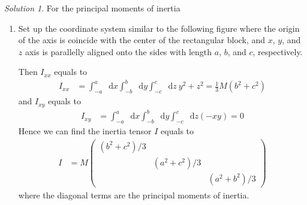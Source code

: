 \documentclass[twoside,11pt]{article}
\renewcommand*\d{\mathop{}\!\mathrm{d}}
\theoremstyle{definition}
\theoremstyle{remark}
\newtheorem*{solution}{Solution}
\begin{document}
\begin{solution}
For the principal moments of inertia
\begin{enumerate}[label=\roman*)]
\item
Set up the coordinate system similar to the following figure where the origin of the axis
is coincide with the center of the rectangular block, and $x$, $y$, and $z$ axis is parallelly aligned
onto the sides with length $a$, $b$, and $c$, respectively.
\begin{figure}[H]
    \tikzexternalenable
    \centering
    \def\a{1.5}
    \def\b{2}
    \def\c{0.8}
    \tikzexternaldisable
\end{figure}
Then $I_{xx}$ equals to
\begin{align*}
    I_{xx} &= \int_{-a}^a\d x \int_{-b}^b\d y \int_{-c}^c\d z~ y^2 + z^2 = \frac{1}{3}M(b^2+c^2)
\end{align*}
and $I_{xy}$ equals to
\begin{align*}
    I_{xy} &= \int_{-a}^a\d x \int_{-b}^b\d y \int_{-c}^c\d z (-xy) = 0
\end{align*}
Hence we can find the inertia tensor $I$ equals to
\begin{align*}
    I &= M\begin{pmatrix}
        (b^2+c^2)/3 & & \\
        & (a^2+c^2)/3 & \\
        & & (a^2+b^2)/3
    \end{pmatrix}
\end{align*}
where the diagonal terms are the principal moments of inertia.


\end{enumerate}
\end{solution}
\end{document}
